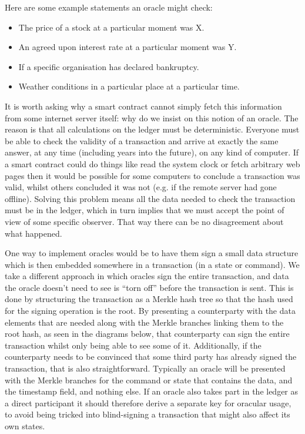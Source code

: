 \documentclass{article}
\begin{document}
Here are some example statements an oracle might check:

\begin{itemize}
\item The price of a stock at a particular moment was X.
\item An agreed upon interest rate at a particular moment was Y.
\item If a specific organisation has declared bankruptcy.
\item Weather conditions in a particular place at a particular time.
\end{itemize}

It is worth asking why a smart contract cannot simply fetch this information from some internet server itself: why
do we insist on this notion of an oracle. The reason is that all calculations on the ledger must be deterministic.
Everyone must be able to check the validity of a transaction and arrive at exactly the same answer, at any time
(including years into the future), on any kind of computer. If a smart contract could do things like read the
system clock or fetch arbitrary web pages then it would be possible for some computers to conclude a transaction
was valid, whilst others concluded it was not (e.g. if the remote server had gone offline). Solving this problem
means all the data needed to check the transaction must be in the ledger, which in turn implies that we must accept
the point of view of some specific observer. That way there can be no disagreement about what happened.

One way to implement oracles would be to have them sign a small data structure which is then embedded somewhere in
a transaction (in a state or command). We take a different approach in which oracles sign the entire transaction,
and data the oracle doesn't need to see is ``torn off'' before the transaction is sent. This is done by structuring
the transaction as a Merkle hash tree so that the hash used for the signing operation is the root. By presenting a
counterparty with the data elements that are needed along with the Merkle branches linking them to the root hash,
as seen in the diagrams below, that counterparty can sign the entire transaction whilst only being able to see some
of it. Additionally, if the counterparty needs to be convinced that some third party has already signed the
transaction, that is also straightforward. Typically an oracle will be presented with the Merkle branches for the
command or state that contains the data, and the timestamp field, and nothing else. If an oracle also takes part
in the ledger as a direct participant it should therefore derive a separate key for oracular usage, to avoid
being tricked into blind-signing a transaction that might also affect its own states.
\end{document}
